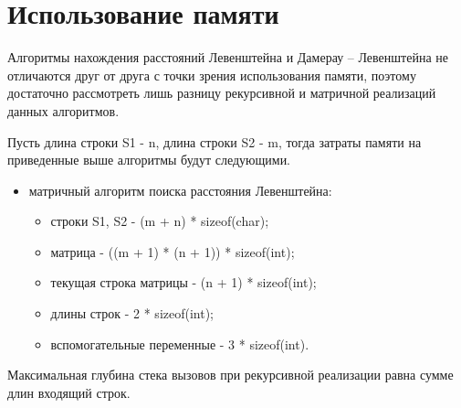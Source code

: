  
\section{Использование памяти}

Алгоритмы нахождения расстояний Левенштейна и Дамерау -- Левенштейна не отличаются друг от друга с точки зрения использования памяти, поэтому достаточно рассмотреть лишь разницу рекурсивной и матричной реализаций данных алгоритмов.

Пусть длина строки S1 - n, длина строки S2 - m, тогда затраты памяти на приведенные выше алгоритмы будут следующими.
\begin{itemize}
	\item матричный алгоритм поиска расстояния Левенштейна:\begin{itemize}
		\item строки S1, S2 - (m + n) * sizeof(char);
		\item матрица - ((m + 1) * (n + 1)) * sizeof(int);
		\item текущая строка матрицы - (n + 1) * sizeof(int);
		\item длины строк - 2 * sizeof(int);
		\item вспомогательные переменные -  3 * sizeof(int).
	\end{itemize}
\end{itemize}

Максимальная глубина стека вызовов при рекурсивной реализации равна сумме длин входящий строк.

